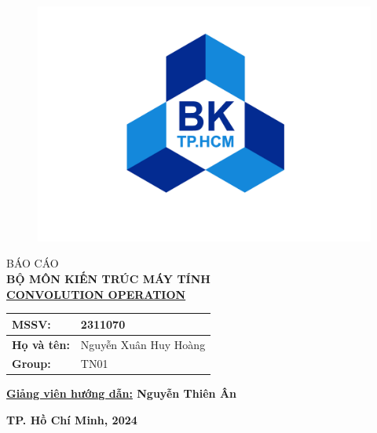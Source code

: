 \documentclass{article}
\begin{document}
\begin{titlepage}
\begin{center}
\begin{figure}[h]
    \centering
    \includegraphics[scale=0.45]{01_logobachkhoa.png}
\end{figure}
\vspace{1pt}
\fontsize{18pt}{0pt}\selectfont BÁO CÁO \\
\vspace{2pt}
\textbf{\fontsize{20pt}{0pt}\selectfont BỘ MÔN KIẾN TRÚC MÁY TÍNH }\\
\vspace{0.5cm}
\underline
{\fontsize{16pt}{1pt}\selectfont \textbf{CONVOLUTION OPERATION}}
\end{center}
\vspace{3.5cm}
\begin{center}
\vspace{0.5cm}
    \begin{tabular}{|w{l}{2cm}p{5.75cm}|}
    \hline
        \textbf{MSSV:} & 2311070 \\
        \hline
        \textbf{Họ và tên:} & Nguyễn Xuân Huy Hoàng \\
        \hline
        \textbf{Group:} & TN01 \\
        \hline
	\end{tabular}
\end{center}
\begin{center}
    \vspace{0.5cm}
    \textbf {
    \underline{Giảng viên hướng dẫn:} Nguyễn Thiên Ân}
\end{center}
\begin{center}
    \large \textbf{TP. Hồ Chí Minh, 2024}
\end{center}
\end{titlepage}
\end{document}
